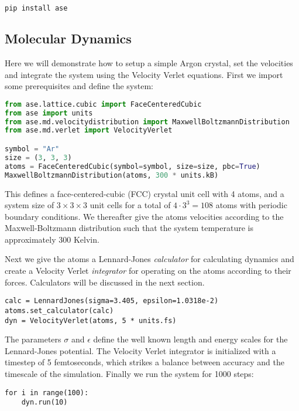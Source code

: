 \begin{lstlisting}[language=bash]
pip install ase
\end{lstlisting}

\subsection{Molecular Dynamics}
Here we will demonstrate how to setup a simple Argon crystal,
set the velocities and integrate the system using
the Velocity Verlet equations.
First we import some prerequisites and define the system:

\begin{lstlisting}[language=python,basicstyle=\small]
from ase.lattice.cubic import FaceCenteredCubic
from ase import units
from ase.md.velocitydistribution import MaxwellBoltzmannDistribution
from ase.md.verlet import VelocityVerlet

symbol = "Ar"
size = (3, 3, 3)
atoms = FaceCenteredCubic(symbol=symbol, size=size, pbc=True)
MaxwellBoltzmannDistribution(atoms, 300 * units.kB)
\end{lstlisting}

This defines a face-centered-cubic (FCC) crystal unit cell
with 4 atoms, and a system size of $3\times3\times3$ unit cells
for a total of $4\cdot3^3 = 108$ atoms with periodic boundary conditions.
We thereafter give the atoms velocities according to the
Maxwell-Boltzmann distribution such that the system temperature
is approximately 300 Kelvin.
\par
Next we give the atoms a Lennard-Jones \textit{calculator}
for calculating dynamics and create a Velocity Verlet \textit{integrator}
for operating on the atoms according to their forces.
Calculators will be discussed in the next section.

\begin{lstlisting}
calc = LennardJones(sigma=3.405, epsilon=1.0318e-2)
atoms.set_calculator(calc)
dyn = VelocityVerlet(atoms, 5 * units.fs)
\end{lstlisting}

The parameters $\sigma$ and $\epsilon$ define the well known
length and energy scales for the Lennard-Jones potential.
The Velocity Verlet integrator is initialized with a timestep
of 5 femtoseconds, which strikes a balance between accuracy
and the timescale of the simulation.
Finally we run the system for 1000 steps:

\begin{lstlisting}
for i in range(100):
    dyn.run(10)
\end{lstlisting}

